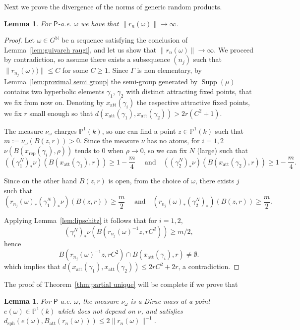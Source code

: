 \documentclass[11pt]{article}
\newtheorem{lemm}[theo]{Lemma}
\theoremstyle{definition}
\numberwithin{equation}{section}
\numberwithin{figure}{section}
\numberwithin{table}{section}
\DeclareMathOperator{\supp}{Supp}
\DeclareMathOperator{\sph}{sph}
\newcommand{\nn}{\mathbb{N}}
\newcommand{\prob}{\mathsf{P}}
\newcommand{\cv}{\rightarrow}
\newcommand{\PP}{\mathbb{P}}
\newcommand{\lrpar}[1]{\left(#1\right)}
\newcommand{\att}{\mathrm{att}}
\newcommand{\rep}{\mathrm{rep}}
\begin{document}
Next we prove the divergence of the norms of generic random products.

\begin{lemm}\label{lem:contraction}
For $\prob$-a.e. $\omega$ we have that $\| r_n(\omega)\| \cv\infty$.
\end{lemm}

\begin{proof}
Let $\omega \in G^\nn$ be a sequence satisfying the conclusion of Lemma~\ref{lem:guivarch raugi}, and let us show that $\| r_n(\omega)\| \cv\infty$. We proceed by contradiction, so assume there exists a subsequence $(n_j)$ such that $\|r_{n_j}(\omega))\|\leq C$ for some $C\geq 1$. Since $\Gamma$ is non elementary, by Lemma~\ref{lem:proximal semi group} the semi-group generated by $\supp(\mu)$ contains two hyperbolic elements $\gamma_1$, $\gamma_2$ with distinct attracting fixed points, that we fix from now on. Denoting by $x_{\att}(\gamma_i)$ the respective attractive fixed points, we fix $r$ small enough so that $d(x_\att(\gamma_1),x_\att(\gamma_2)) > 2r (C^2+1)$.

The measure $\nu_\omega$ charges $\PP^1(k)$, so one can find a point $z\in \PP^1(k)$ such that $m := \nu_\omega(B(z,r))>0$. Since the measure $\nu$ has no atoms, for $i=1, 2$ $ \nu(B(x_\rep(\gamma_i),\rho))$ tends to $0$ when $\rho\to0$, so we can fix $N$ (large) such that
\[
((\gamma_1^N)_*\nu) (B(x_\att(\gamma_1),r)) \geq 1- \frac{m}{4} \quad\text{ and}\quad ((\gamma_2^{N})_*\nu)(B(x_\att(\gamma_2),r)) \geq 1- \frac{m}{4}.
\]

Since on the other hand $B(z,r)$ is open, from the choice of $\omega$, there exists $j$ such that
\[
\lrpar{ r_{n_j}(\omega)_* (\gamma_1^N)_*\nu} (B(z,r)) \geq \frac{m}{2}
\quad\text{ and}\quad \lrpar{ r_{n_j}(\omega)_*(\gamma_2^{N})_*} (B(z,r)) \geq \frac{m}{2}.
\]

Applying Lemma~\ref{lem:lipschitz} it follows that for $i=1,2$,
\[
(\gamma_i^N)_*\nu(B(r_{n_j}(\omega)^{-1}z, rC^2))\geq m/2,
\]
hence
\[
B(r_{n_j}(\omega)^{-1}z, rC^2)\cap B(x_\att(\gamma_i),r) \neq \emptyset.
\]
which implies that $d(x_\att(\gamma_1), x_\att(\gamma_2)) \le 2rC^2 + 2r$, a contradiction.
\end{proof}

The proof of Theorem~\ref{thm:partial unique} will be complete if we prove that

\begin{lemm}\label{lem:Dirac}
For $\prob$-a.e. $\omega$, the measure $\nu_\omega$ is a Dirac mass at a point $e(\omega)\in \PP^1(k)$ which does not depend on $\nu$, and satisfies $d_{\sph}(e(\omega), B_\att(r_n(\omega))) \le 2\|r_n(\omega)\|^{-1}$.
\end{lemm}
\end{document}
